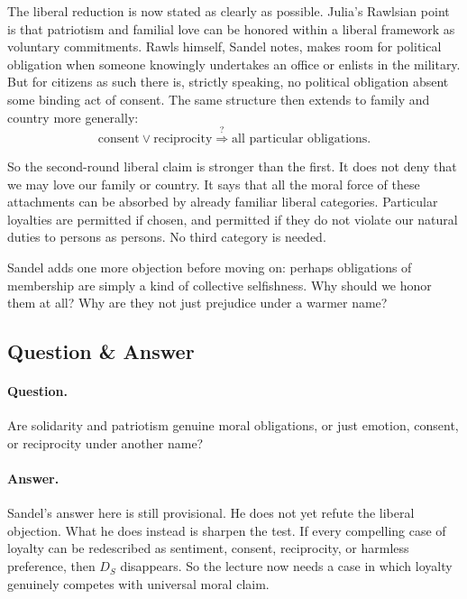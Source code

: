 The liberal reduction is now stated as clearly as possible. Julia's Rawlsian point is that patriotism and familial love can be honored within a liberal framework as voluntary commitments. Rawls himself, Sandel notes, makes room for political obligation when someone knowingly undertakes an office or enlists in the military. But for citizens as such there is, strictly speaking, no political obligation absent some binding act of consent. The same structure then extends to family and country more generally:
\begin{equation}
\text{consent} \lor \text{reciprocity}
\stackrel{?}{\Longrightarrow}
\text{all particular obligations}.
\end{equation}

So the second-round liberal claim is stronger than the first. It does not deny that we may love our family or country. It says that all the moral force of these attachments can be absorbed by already familiar liberal categories. Particular loyalties are permitted if chosen, and permitted if they do not violate our natural duties to persons as persons. No third category is needed.

Sandel adds one more objection before moving on: perhaps obligations of membership are simply a kind of collective selfishness. Why should we honor them at all? Why are they not just prejudice under a warmer name?

\subsection{Question \& Answer}

\paragraph{Question.} Are solidarity and patriotism genuine moral obligations, or just emotion, consent, or reciprocity under another name?

\paragraph{Answer.} Sandel's answer here is still provisional. He does not yet refute the liberal objection. What he does instead is sharpen the test. If every compelling case of loyalty can be redescribed as sentiment, consent, reciprocity, or harmless preference, then \(D_S\) disappears. So the lecture now needs a case in which loyalty genuinely competes with universal moral claim.

